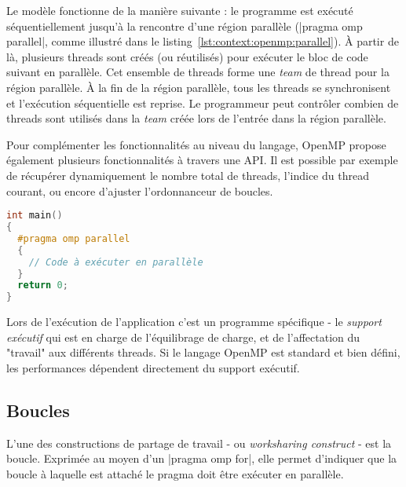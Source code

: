 Le modèle fonctionne de la manière suivante : le programme est exécuté séquentiellement jusqu'à la rencontre d'une région parallèle (|pragma omp parallel|, comme illustré dans le listing~\ref{lst:context:openmp:parallel}).
À partir de là, plusieurs threads sont créés (ou réutilisés) pour exécuter le bloc de code suivant en parallèle.
Cet ensemble de threads forme une \emph{team} de thread pour la région parallèle.
À la fin de la région parallèle, tous les threads se synchronisent et l'exécution séquentielle est reprise.
Le programmeur peut contrôler combien de threads sont utilisés dans la \emph{team} créée lors de l'entrée dans la région parallèle.

Pour complémenter les fonctionnalités au niveau du langage, OpenMP propose également plusieurs fonctionnalités à travers une API.
Il est possible par exemple de récupérer dynamiquement le nombre total de threads, l'indice du thread courant, ou encore d'ajuster l'ordonnanceur de boucles.

\begin{lstlisting}[language=c++,caption=Région parallèle minimale,label=lst:context:openmp:parallel,basicstyle=\small]
int main()
{
  #pragma omp parallel
  {
    // Code à exécuter en parallèle
  }
  return 0;
}
\end{lstlisting}


Lors de l'exécution de l'application c'est un programme spécifique - le \emph{support exécutif} qui est en charge de l'équilibrage de charge, et de l'affectation du "travail" aux différents threads.
Si le langage OpenMP est standard et bien défini, les performances dépendent directement du support exécutif.



\subsection{Boucles}

L'une des constructions de partage de travail - ou \emph{worksharing construct} - est la boucle.
Exprimée au moyen d'un |pragma omp for|, elle permet d'indiquer que la boucle à laquelle est attaché le pragma doit être exécuter en parallèle.

